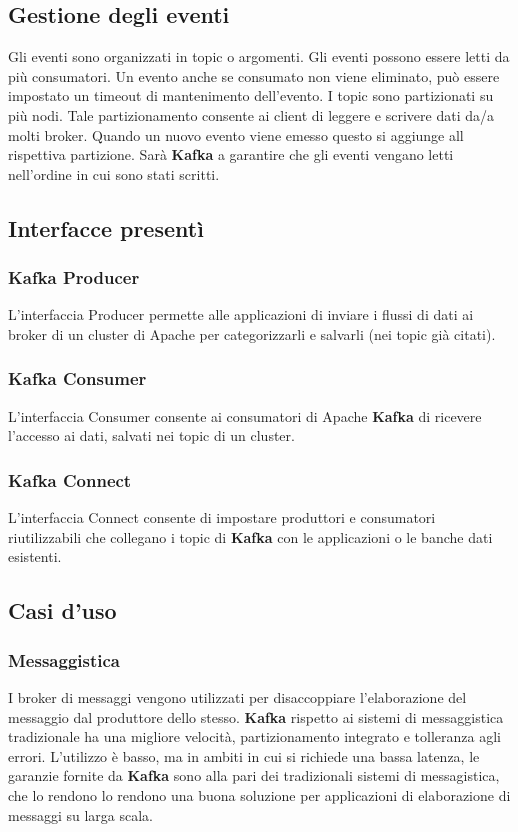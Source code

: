 \documentclass{article}
\begin{document}
\subsection{Gestione degli eventi}
Gli eventi sono organizzati in topic o argomenti. Gli eventi possono essere letti da più consumatori. 
Un evento anche se consumato non viene eliminato, può essere impostato un timeout di mantenimento dell'evento.
I topic sono partizionati su più nodi. Tale partizionamento consente ai client di leggere e scrivere dati da/a molti broker. Quando un nuovo evento viene emesso questo si aggiunge all rispettiva partizione. Sarà \textbf{\textbf{Kafka}} a garantire che gli eventi vengano letti nell'ordine in cui sono stati scritti.
\subsection{Interfacce presentì}
\subsubsection{\textbf{Kafka} Producer}
L’interfaccia Producer permette alle applicazioni di inviare i flussi di dati ai broker di un cluster di Apache per categorizzarli e salvarli (nei topic già citati).
\subsubsection{\textbf{Kafka} Consumer}
L’interfaccia Consumer consente ai consumatori di Apache \textbf{Kafka} di  ricevere l’accesso ai dati, salvati nei topic di un cluster.
 \subsubsection{\textbf{Kafka} Connect}
    L’interfaccia Connect  consente di impostare produttori e consumatori riutilizzabili che collegano i topic di \textbf{Kafka} con le applicazioni o le banche dati esistenti.
\subsection{Casi d'uso}
\subsubsection{Messaggistica}
I broker di messaggi vengono utilizzati per disaccoppiare l'elaborazione del messaggio dal produttore dello stesso.
\textbf{Kafka} rispetto ai sistemi di messaggistica tradizionale ha una migliore velocità, partizionamento integrato e tolleranza agli errori.
L'utilizzo è basso, ma in ambiti in cui si richiede una bassa latenza, le garanzie fornite da \textbf{Kafka} sono alla pari dei tradizionali sistemi di messagistica, che lo rendono lo rendono una buona soluzione per applicazioni di elaborazione di messaggi su larga scala.
\end{document}
